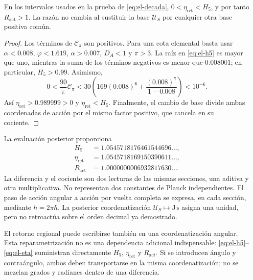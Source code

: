 \begin{proposition}
En los intervalos usados en la prueba de \eqref{eq:el-decada},
\(0<\eta_{\mathrm{ret}}<H_5\), y por tanto
\(R_{\mathrm{act}}>1\). La razón no cambia al sustituir la base
\(\mathcal U_S\) por cualquier otra base positiva común.
\end{proposition}
\begin{proof}
Los términos de \(\mathcal C_\pi\) son positivos. Para una cota
elemental basta usar \(\alpha<0.008\), \(\varphi<1.619\),
\(\alpha>0.007\), \(D_A<1\) y \(\pi>3\). La raíz en
\eqref{eq:el-h5} es mayor que uno, mientras la suma de los términos
negativos es menor que \(0.008001\); en particular, \(H_5>0.99\).
Asimismo,
\[
 0<\frac{90}{\pi}\mathcal C_\pi
 <30\left(169(0.008)^6+
           \frac{(0.008)^7}{1-0.008}\right)<10^{-6}.
\]
Así \(\eta_{\mathrm{ret}}>0.989999>0\) y
\(\eta_{\mathrm{ret}}<H_5\). Finalmente, el cambio de base divide
ambas coordenadas de acción por el mismo factor positivo, que cancela en
su cociente.
\end{proof}

La evaluación posterior proporciona
\begin{align*}
 H_5&=1.0545718176461544696\ldots,\\
 \eta_{\mathrm{ret}}&=1.0545718169150390611\ldots,\\
 R_{\mathrm{act}}&=1.0000000006932817630\ldots.
\end{align*}
La diferencia y el cociente son dos lecturas de las mismas secciones,
una aditiva y otra multiplicativa. No representan dos constantes de
Planck independientes. El paso de acción angular a acción por vuelta
completa se expresa, en cada sección, mediante
\(h=2\pi\hbar\). La posterior coordenatización
\(\mathcal U_S\mapsto\mathrm{J\,s}\) asigna una unidad, pero no
retroactúa sobre el orden decimal ya demostrado.

El retorno regional puede escribirse también en una coordenatización angular.
Esta reparametrización no es una dependencia adicional indispensable:
\eqref{eq:el-h5}--\eqref{eq:el-eta} suministran directamente
\(H_5\), \(\eta_{\mathrm{ret}}\) y \(R_{\mathrm{act}}\). Si se
introducen ángulo y contraángulo, ambos deben transportarse en la misma
coordenatización; no se mezclan grados y radianes dentro de una diferencia.


